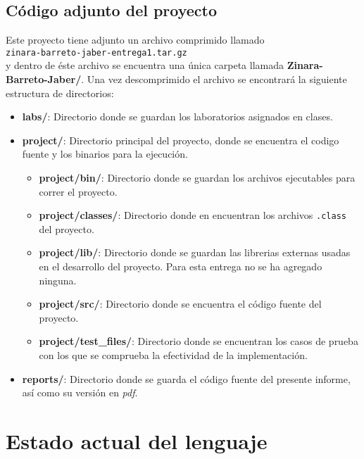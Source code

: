 \documentclass[12pt, spanish]{report}
\begin{document}
\section{C\'odigo adjunto del proyecto}
\label{sec:correr}

Este proyecto tiene adjunto un archivo comprimido llamado\\

\texttt{zinara-barreto-jaber-entrega1.tar.gz}\\

y dentro de \'este archivo se encuentra una \'unica carpeta llamada
\textbf{Zinara-Barreto-Jaber/}. Una vez descomprimido el archivo se
encontrar\'a la siguiente estructura de directorios:

\begin{itemize}
 \item \textbf{labs/}: Directorio donde se guardan los laboratorios
       asignados en clases.
 \item \textbf{project/}: Directorio principal del proyecto, donde se
       encuentra el codigo fuente y los binarios para la ejecuci\'on.
 \begin{itemize}
  \item \textbf{project/bin/}: Directorio donde se guardan los
	archivos ejecutables para correr el proyecto.
  \item \textbf{project/classes/}: Directorio donde en encuentran los
	archivos \texttt{.class} del proyecto.
  \item \textbf{project/lib/}: Directorio donde se guardan las
	librerias externas usadas en el desarrollo del proyecto. Para esta
	entrega no se ha agregado ninguna.
  \item \textbf{project/src/}: Directorio donde se encuentra el c\'odigo
	fuente del proyecto.
  \item \textbf{project/test\_files/}: Directorio donde se encuentran los
	casos de prueba con los que se comprueba la efectividad de la implementaci\'on.
 \end{itemize}
 \item \textbf{reports/}: Directorio donde se guarda el c\'odigo fuente
       del presente informe, as\'i como su versi\'on en \emph{pdf}.
\end{itemize}

\chapter{Estado actual del lenguaje}
\label{chap:estado}
\end{document}
